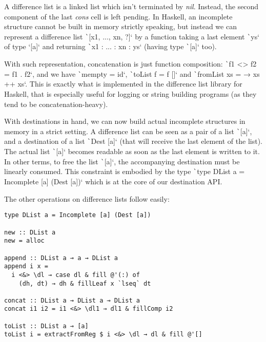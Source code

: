 \documentclass[english]{jflart}
\begin{document}
A difference list is a linked list which isn't terminated by \emph{nil}. Instead, the second component of the last \emph{cons} cell is left pending. In Haskell, an incomplete structure cannot be built in memory strictly speaking, but instead we can represent a difference list \texttt`[x1, ..., xn, ?]` by a function taking a last element \texttt`ys` of type `[a]` and returning \texttt`x1 : ... : xn : ys` (having type \texttt`[a]` too).

With such representation, concatenation is just function composition: \texttt`f1 <> f2 = f1 . f2`, and we have \texttt`mempty = id`, \texttt`toList f = f []` and \texttt`fromList xs = \ys → xs ++ xs`. This is exactly what is implemented in the difference list library for Haskell, that is especially useful for logging or string building programs (as they tend to be concatenation-heavy).

With destinations in hand, we can now build actual incomplete structures in memory in a strict setting. A difference list can be seen as a pair of a list \texttt`[a]`, and a destination of a list \texttt`Dest [a]` (that will receive the last element of the list). The actual list \texttt`[a]` becomes readable as soon as the last element is written to it. In other terms, to free the list \texttt`[a]`, the accompanying destination must be linearly consumed. This constraint is embodied by the type \texttt`type DList a = Incomplete [a] (Dest [a])` which is at the core of our destination API.

The other operations on difference lists follow easily:
\begin{verbatim}
type DList a = Incomplete [a] (Dest [a])

new :: DList a
new = alloc

append :: DList a ⊸ a → DList a
append i x =
  i <&> \dl → case dl & fill @'(:) of
    (dh, dt) → dh & fillLeaf x `lseq` dt

concat :: DList a ⊸ DList a ⊸ DList a
concat i1 i2 = i1 <&> \dl1 → dl1 & fillComp i2

toList :: DList a ⊸ [a]
toList i = extractFromReg $ i <&> \dl → dl & fill @'[]
\end{verbatim}
\end{document}
